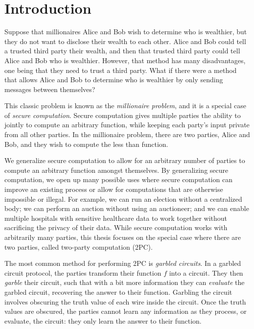

\chapter*{Introduction}

Suppose that millionaires Alice and Bob wish to determine who is wealthier, but they do not want to disclose their wealth to each other.
Alice and Bob could tell a trusted third party their wealth, and then that trusted third party could tell Alice and Bob who is wealthier.
However, that method has many disadvantages, one being that they need to trust a third party.
What if there were a method that allows Alice and Bob to determine who is wealthier by only sending messages between themselves?

This classic problem is known as the \textit{millionaire problem}, and it is a special case of \textit{secure computation}.
Secure computation gives multiple parties the ability to jointly to compute an arbitrary function, while keeping each party's input private from all other parties.
In the millionaire problem, there are two parties, Alice and Bob, and they wish to compute the less than function.

We generalize secure computation to allow for an arbitrary number of parties to compute an arbitrary function amongst themselves. 
By generalizing secure computation, we open up many possible uses where secure computation can improve an existing process or allow for computations that are otherwise impossible or illegal. 
For example, we can run an election without a centralized body; we can perform an auction without using an auctioneer; and we can enable multiple hospitals with sensitive healthcare data to work together without sacrificing the privacy of their data.
While secure computation works with arbitrarily many parties, this thesis focuses on the special case where there are two parties, called two-party computation (2PC).

The most common method for performing 2PC is \textit{garbled circuits}.
In a garbled circuit protocol, the parties transform their function $f$ into a circuit. 
They then \textit{garble} their circuit, such that with a bit more information they can \textit{evaluate} the garbled circuit, recovering the answer to their function.
Garbling the circuit involves obscuring the truth value of each wire inside the circuit.
Once the truth values are obscured, the parties cannot learn any information as they process, or evaluate, the circuit: they only learn the answer to their function.

